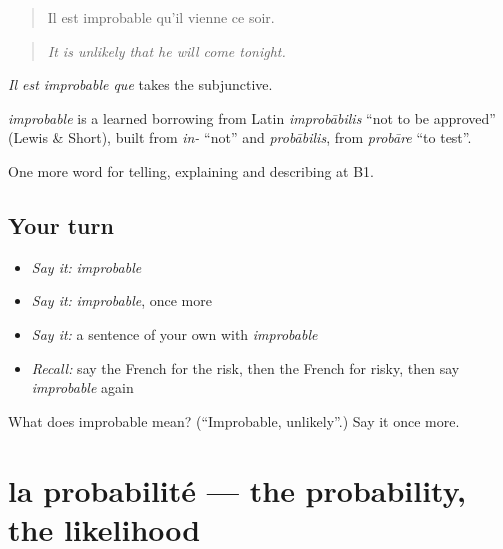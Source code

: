 \begin{quote}
Il est improbable qu'il vienne ce soir.
\end{quote}

\begin{quote}
\emph{It is unlikely that he will come tonight.}
\end{quote}

\emph{Il est improbable que} takes the subjunctive.

\begin{cousinweb}
\emph{improbable} is a learned borrowing from Latin \emph{improbābilis} \textquotedblleft{}not to be approved\textquotedblright{} (Lewis \& Short), built from \emph{in-} \textquotedblleft{}not\textquotedblright{} and \emph{probābilis}, from \emph{probāre} \textquotedblleft{}to test\textquotedblright{}.
\end{cousinweb}

\begin{grammarlens}[title={What you've built}]
One more word for telling, explaining and describing at B1.
\end{grammarlens}

\subsection*{Your turn}
\begin{itemize}
\raggedright
  \item \emph{Say it:} \emph{improbable}
  \item \emph{Say it:} \emph{improbable}, once more
  \item \emph{Say it:} a sentence of your own with \emph{improbable}
  \item \emph{Recall:} say the French for the risk, then the French for risky, then say \emph{improbable} again
\end{itemize}

\begin{tcolorbox}[breakable,colback=teal!4,colframe=teal!35!black,title={Before you move on}]
What does improbable mean? (\textquotedblleft{}Improbable, unlikely\textquotedblright{}.) Say it once more.
\end{tcolorbox}
\section[la probabilité]{la probabilité — the probability, the likelihood}

\label{lesson:FR-C372-probabilite}



